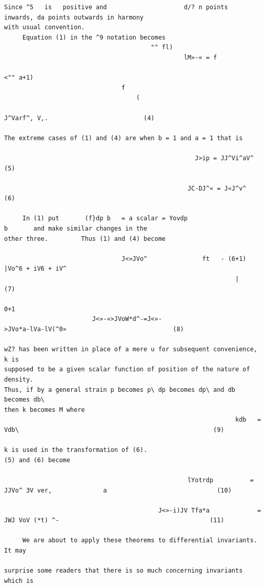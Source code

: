 \documentclass[10pt]{article}
\begin{document}
\begin{verbatim}
Since ^5   is   positive and                     d/? n points        inwards, da points outwards in harmony
with usual convention.
     Equation (1) in the ^9 notation becomes
                                        "" fl)
                                                 lM»-« = f
                                                                     <"" a+1)
                                f
                                    (
                                                                                          J^Varf^, V,.                          (4)

The extreme cases of (1) and (4) are when b = 1 and a = 1 that is

                                                    J>ip = JJ^Vi^aV^                                                            (5)

                                                  JC-DJ^« = J«J^v^                                                              (6)

     In (1) put       (f}dp b   = a scalar = Yovdp                                b       and make similar changes in the
other three.         Thus (1) and (4) become

                                J<»JVo^               ft   - (6+1) |Vo^6 + iV6 + iV^
                                                               |                                                                (7)
                                                                     0+1
                        J<»-«>JVoW*d^-=J<»-                                       >JVo*a-lVa-lV(^0»                             (8)

wZ? has been written in place of a mere u for subsequent convenience,                                                          k is
supposed to be a given scalar function of position of the nature of density.
Thus, if by a general strain p becomes p\ dp becomes dp\ and db becomes db\
then k becomes M where
                                                               kdb   = Vdb\                                                     (9)

k is used in the transformation of (6).                                           (5) and (6) become

                                                  lYotrdp          = JJVo^ 3V ver,              a                              (10)

                                          J<»-i)JV Tfa*a             = JWJ VoV (*t) ^-                                         (11)

     We are about to apply these theorems to differential invariants.                                                       It may

surprise some readers that there is so much concerning invariants which is


\end{verbatim}
\end{document}
